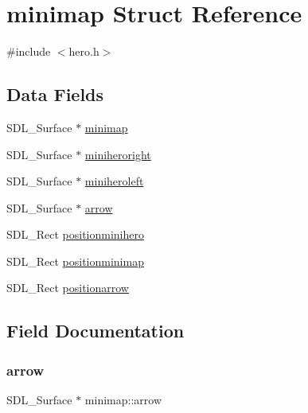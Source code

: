 \hypertarget{structminimap}{}\section{minimap Struct Reference}
\label{structminimap}


{\ttfamily \#include $<$hero.\+h$>$}

\subsection*{Data Fields}
\begin{DoxyCompactItemize}
\item 
S\+D\+L\+\_\+\+Surface $\ast$ \hyperlink{structminimap_a91f3511bf598b0975ad0cc6cef01e083}{minimap}
\item 
S\+D\+L\+\_\+\+Surface $\ast$ \hyperlink{structminimap_a65975b9ab10e99ac2975d3b124e1fd95}{miniheroright}
\item 
S\+D\+L\+\_\+\+Surface $\ast$ \hyperlink{structminimap_ad2ac04771114b30c06cd0b6769da3adc}{miniheroleft}
\item 
S\+D\+L\+\_\+\+Surface $\ast$ \hyperlink{structminimap_ae4646d13e408c328abb6ba01678ff430}{arrow}
\item 
S\+D\+L\+\_\+\+Rect \hyperlink{structminimap_a5b8800e04dc9b89c2964d04c46a34da4}{positionminihero}
\item 
S\+D\+L\+\_\+\+Rect \hyperlink{structminimap_a1daef1078e2acbafbf95d9b37471847f}{positionminimap}
\item 
S\+D\+L\+\_\+\+Rect \hyperlink{structminimap_afdc2c993b098b8b208bde4b0195039c3}{positionarrow}
\end{DoxyCompactItemize}


\subsection{Field Documentation}
\mbox{\label{structminimap_ae4646d13e408c328abb6ba01678ff430}} 
\subsubsection{\texorpdfstring{arrow}{arrow}}
{\footnotesize\ttfamily S\+D\+L\+\_\+\+Surface $\ast$ minimap\+::arrow}

\mbox{\label{structminimap_ad2ac04771114b30c06cd0b6769da3adc}} 
